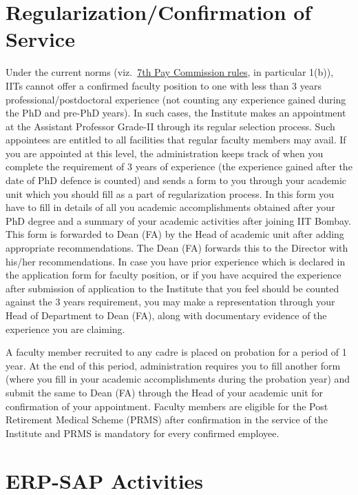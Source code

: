 \documentclass[
  10pt,
  a5paper,
  10pt,
  openany]{amsbook}
\begin{document}
\chapter{Regularization/Confirmation of
Service}\label{sec:regularization}

Under the current norms
(viz.~\href{https://www.education.gov.in/sites/upload_files/mhrd/files/7th\%20CPC\%20Order\%20CFTIs.pdf}{7th
Pay Commission rules}, in particular 1(b)), IITs cannot offer a
confirmed faculty position to one with less than 3 years
professional/postdoctoral experience (not counting any experience gained
during the PhD and pre-PhD years). In such cases, the Institute makes an
appointment at the Assistant Professor Grade-II through its regular
selection process. Such appointees are entitled to all facilities that
regular faculty members may avail. If you are appointed at this level,
the administration keeps track of when you complete the requirement of 3
years of experience (the experience gained after the date of PhD defence
is counted) and sends a form to you through your academic unit which you
should fill as a part of regularization process. In this form you have
to fill in details of all you academic accomplishments obtained after
your PhD degree and a summary of your academic activities after joining
IIT Bombay. This form is forwarded to Dean (FA) by the Head of academic
unit after adding appropriate recommendations. The Dean (FA) forwards
this to the Director with his/her recommendations. In case you have
prior experience which is declared in the application form for faculty
position, or if you have acquired the experience after submission of
application to the Institute that you feel should be counted against the
3 years requirement, you may make a representation through your Head of
Department to Dean (FA), along with documentary evidence of the
experience you are claiming.

A faculty member recruited to any cadre is placed on probation for a
period of 1 year. At the end of this period, administration requires you
to fill another form (where you fill in your academic accomplishments
during the probation year) and submit the same to Dean (FA) through the
Head of your academic unit for confirmation of your appointment. Faculty
members are eligible for the Post Retirement Medical Scheme (PRMS) after
confirmation in the service of the Institute and PRMS is mandatory for
every confirmed employee.

\chapter{ERP-SAP Activities}\label{erp-sap-activities}
\end{document}
